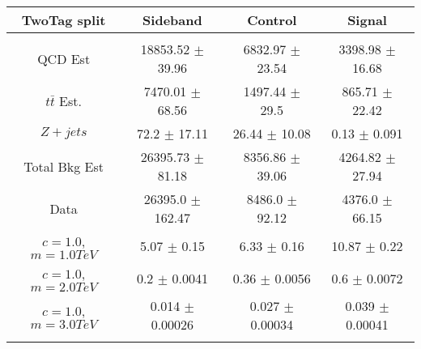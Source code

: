 \begin{footnotesize} 
\begin{tabular}{c|c|c|c} 
TwoTag split & Sideband & Control & Signal \\ 
\hline\hline 
& & & \\ 
QCD Est & 18853.52 $\pm$ 39.96 & 6832.97 $\pm$ 23.54 & 3398.98 $\pm$ 16.68\\ 
$t\bar{t}$ Est.  & 7470.01 $\pm$ 68.56 & 1497.44 $\pm$ 29.5 & 865.71 $\pm$ 22.42\\ 
$Z+jets$ & 72.2 $\pm$ 17.11 & 26.44 $\pm$ 10.08 & 0.13 $\pm$ 0.091\\ 
Total Bkg Est & 26395.73 $\pm$ 81.18 & 8356.86 $\pm$ 39.06 & 4264.82 $\pm$ 27.94\\ 
Data & 26395.0 $\pm$ 162.47 & 8486.0 $\pm$ 92.12 & 4376.0 $\pm$ 66.15\\ 
$c=1.0$,$m=1.0TeV$ & 5.07 $\pm$ 0.15 & 6.33 $\pm$ 0.16 & 10.87 $\pm$ 0.22\\ 
$c=1.0$,$m=2.0TeV$ & 0.2 $\pm$ 0.0041 & 0.36 $\pm$ 0.0056 & 0.6 $\pm$ 0.0072\\ 
$c=1.0$,$m=3.0TeV$ & 0.014 $\pm$ 0.00026 & 0.027 $\pm$ 0.00034 & 0.039 $\pm$ 0.00041\\ 
& & & \\ 
\hline\hline 
\end{tabular} 
\end{footnotesize} 
\newline 
